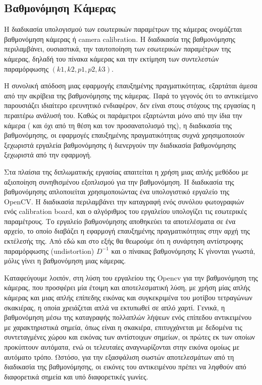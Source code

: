 






\subsection{Βαθμονόμηση Κάμερας}


Η διαδικασία υπολογισμού των εσωτερικών παραμέτρων της κάμερας ονομάζεται βαθμονόμηση κάμερας ή camera calibration. 
Η διαδικασία της βαθμονόμησης περιλαμβάνει, ουσιαστικά, την ταυτοποίηση των εσωτερικών παραμέτρων της κάμερας, δηλαδή του πίνακα κάμερας και την εκτίμηση των συντελεστών παραμόρφωσης $(k1, k2, p1, p2, k3)$.

Η συνολική απόδοση μιας εφαρμογής επαυξημένης πραγματικότητας, εξαρτάται άμεσα από την ακρίβεια της βαθμονόμησης της κάμερας. Παρά το γεγονός ότι το αντικείμενο παρουσιάζει ιδιαίτερο ερευνητικό ενδιαφέρον, δεν είναι στους στόχους της εργασίας η περαιτέρω ανάλυσή του.  
Καθώς οι παράμετροι εξαρτώνται μόνο από την ίδια την κάμερα ( και όχι από τη θέση και τον προσανατολισμό της), η διαδικασία της βαθμονόμησης, οι εφαρμογές επαυξημένης πραγματικότητας συχνά χρησιμοποιούν ξεχωριστά εργαλεία βαθμονόμησης ή διενεργούν την διαδικασία βαθμονόμησης ξεχωριστά από την εφαρμογή. 


Στα πλαίσια της διπλωματικής εργασίας απαιτείται η χρήση μιας απλής μεθόδου με αξιοποίηση συνηθισμένου εξοπλισμού για την βαθμονόμηση. Η διαδικασία της βαθμονόμησης απλοποιείται χρησιμοποιώντας ένα υπολογιστικό εργαλείο της OpenCV. Η διαδικασία περιλαμβάνει την καταγραφή ενός συνόλου φωτογραφιών ενός calibration board, και ο αλγόριθμος του εργαλείου υπολογίζει τις εσωτερικές παραμέτρους.
Το εργαλείο βαθμονόμησης αποθηκεύει τα αποτελέσματα σε ένα αρχείο, το οποίο διαβάζει η εφαρμογή επαυξημένης πραγματικότητας στην αρχή της εκτέλεσής της. Από εδώ και στο εξής θα θεωρούμε ότι η συνάρτηση αντίστροφης παραμόρφωσης (undistortion) $D^{-1}$ και ο πίνακας βαθμονόμησης Κ γίνονται γνωστά, μόλις γίνει η βαθμονόμηση μιας κάμερας.



Καταφεύγουμε λοιπόν, στη λύση του εργαλείου της Opencv για την βαθμονόμηση της κάμερας\cite{calibrationtool}, που προσφέρει μία έτοιμη και αποτελεσματική λύση, με χρήση μίας απλής κάμερας και μιας απλής επίπεδης εικόνας και συγκεκριμένα του μοτίβου τετραγώνων σκακιέρας, η οποία χρειάζεται απλά να εκτυπωθεί σε απλό χαρτί. 
Γενικά, η βαθμονόμηση μέσω της καταγραφής πολλαπλών λήψεων ενός επίπεδου αντικειμένου με χαρακτηριστικά σημεία, όπως είναι η σκακιέρα, επιτυγχάνεται με δεδομένα τις συντεταγμένες χώρου και εικόνας των αντίστοιχων σημείων, οι πρώτες εκ των οποίων προκύπτουν αυτόματα, ενώ οι τελευταίες αναγνωρίζονται στην εικόνα ομοίως με αυτόματο τρόπο. Ωστόσο, για την εξασφάλιση σωστών αποτελεσμάτων από τη διαδικασία της βαθμονόμησης, οι εικόνες του αντικειμένου πρέπει να ληφθούν από διαφορετικά σημεία και υπό διαφορετικές γωνίες. 


